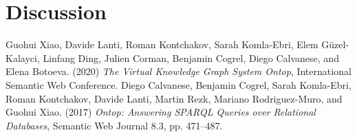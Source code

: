 \documentclass{article}
\begin{document}

\newpage



\section{Discussion}



\begin{thebibliography}{99}
Guohui Xiao, Davide Lanti, Roman Kontchakov, Sarah Komla-Ebri, Elem Güzel-Kalayci, Linfang Ding, Julien Corman, Benjamin Cogrel, Diego Calvanese, and Elena Botoeva. (2020) \emph{The Virtual Knowledge Graph System Ontop}, International Semantic Web Conference.
Diego Calvanese, Benjamin Cogrel, Sarah Komla-Ebri, Roman Kontchakov, Davide Lanti, Martin Rezk, Mariano Rodriguez-Muro, and Guohui Xiao. (2017) \emph{Ontop: Answering SPARQL Queries over Relational Databases}, Semantic Web Journal 8.3, pp. 471–487.
\end{thebibliography}
\end{document}
